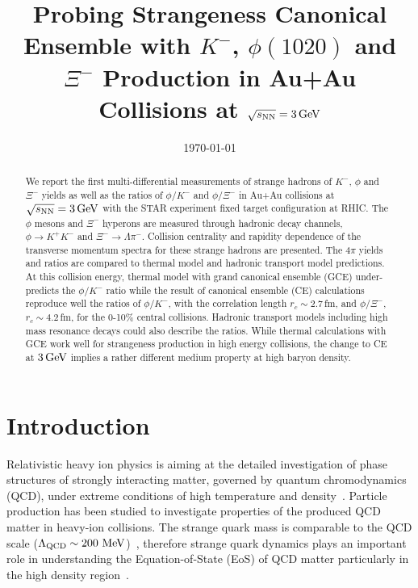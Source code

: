 \documentclass[aps,tightenlines,superscriptaddress,twocolumn]{revtex4-1}
\begin{document}
\title{Probing Strangeness Canonical Ensemble with $K^{-}$, $\phi(1020)$ and $\Xi^{-}$ Production in Au+Au Collisions at ${\sqrt{s_{\rm NN}} = \rm{3\,GeV}}$}%


%

\linenumbers

\date{\today}

\begin{abstract}
We report the first multi-differential measurements of strange hadrons of $K^{-}$, $\phi$ and $\Xi^{-}$ yields as well as the ratios of $\phi/K^-$ and $\phi/\Xi^-$ in Au+Au collisions at ${\sqrt{s_{\rm NN}} = \rm{3\,GeV}}$ with the STAR experiment fixed target configuration at RHIC. The $\phi$ mesons and $\Xi^{-}$ hyperons are measured through hadronic decay channels, $\phi\rightarrow K^+K^-$ and $\Xi^-\rightarrow \Lambda\pi^-$. 
Collision centrality and rapidity dependence of the transverse momentum spectra for these strange hadrons are presented. The $4\pi$ yields and ratios are compared to thermal model and hadronic transport model predictions.
At this collision energy, thermal model with grand canonical ensemble (GCE) under-predicts the $\phi/K^-$ ratio while the result of canonical ensemble (CE) calculations reproduce well the ratios of $\phi/K^-$, with the correlation length $r_c \sim 2.7$\,fm, and $\phi/\Xi^-$, $r_c \sim 4.2$\,fm, for the 0-10\% central collisions. Hadronic transport models including high mass resonance decays could also describe the ratios.
While thermal calculations with GCE work well for strangeness production in high energy collisions, the change to CE at $\rm{3\,GeV}$ implies a rather different medium property at high baryon density. 
\end{abstract}

\maketitle

\linenumbers

\section{Introduction}
\label{introduction}

Relativistic heavy ion physics is aiming at the detailed investigation of phase structures of strongly interacting matter, governed by quantum chromodynamics (QCD), under extreme conditions of high temperature and density~\cite{StarWhitePaper_2005,akiba2015hot,Busza_ARNPS:2018}. Particle production has been studied to investigate properties of the produced QCD matter in heavy-ion collisions. The strange quark mass is comparable to the QCD scale ($\Lambda_{\rm{QCD}}$\,$\sim\textup{200 MeV}$)~\cite{Rafelski:1982pu,Koch:1986ud}, 
therefore strange quark dynamics plays an important role in understanding the Equation-of-State (EoS) of QCD matter particularly in the high density region~\cite{KO.PhysRevLett.55.2661:1985,FUCHS20061_kaons:2006,KO_sQM2017,Ks0_Lambda_HADES:2019}. 
\end{document}
